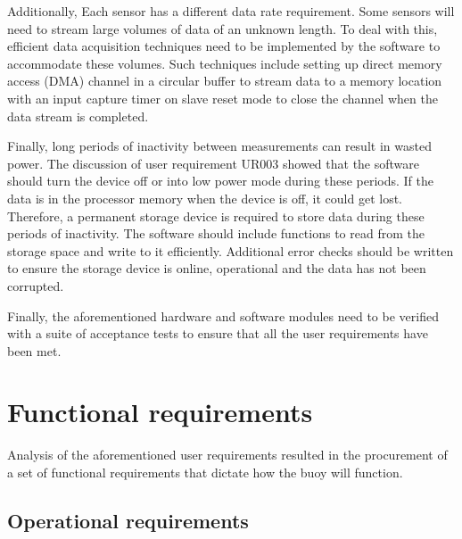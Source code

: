 Additionally, Each sensor has a different data rate requirement. Some sensors will need to stream large volumes of data of an unknown length. To deal with this, efficient data acquisition techniques need to be implemented by the software to accommodate these volumes. Such techniques include setting up direct memory access (DMA) channel in a circular buffer to stream data to a memory location with an input capture timer on slave reset mode to close the channel when the data stream is completed.\par 

Finally, long periods of inactivity between measurements can result in wasted power. The discussion of user requirement UR003 showed that the software should turn the device off or into low power mode during these periods. If the data is in the processor memory when the device is off, it could get lost. Therefore, a permanent storage device is required to store data during these periods of inactivity. The software should include functions to read from the storage space and write to it efficiently. Additional error checks should be written to ensure the storage device is online, operational and the data has not been corrupted.

Finally, the aforementioned hardware and software modules need to be verified with a suite of acceptance tests to ensure that all the user requirements have been met. 


\section{Functional requirements}
\label{sec:ch3_FR}
Analysis of the aforementioned user requirements resulted in the procurement of a set of functional requirements that dictate how the buoy will function.

\subsection{Operational requirements }

